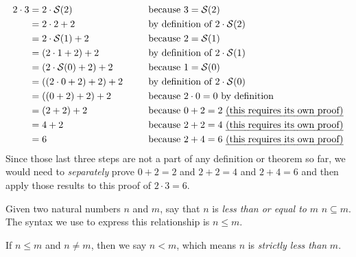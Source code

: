 \begin{example}[$2 \cdot 3 = 6$]
    ~\vspace{-\baselineskip}
    \begin{alignat*}{2}
        2 \cdot 3 &= 2 \cdot \successor{2} &&\text{ because } 3 = \successor{2}\\
              &= 2 \cdot 2 + 2 &&\text{ by definition of } 2 \cdot \successor{2}\\
              &= 2 \cdot \successor{1} + 2 &&\text{ because } 2 = \successor{1}\\
              &= \pn*{2 \cdot 1 + 2} + 2 &&\text{ by definition of } 2 \cdot \successor{1}\\
              &= \pn*{2 \cdot \successor{0} + 2} + 2 &&\text{ because } 1 = \successor{0}\\
              &= \pn*{\pn*{2 \cdot 0 + 2} + 2} + 2~~~~&&\text{ by definition of } 2 \cdot \successor{0}\\
              &= \pn*{\pn*{0 + 2} + 2} + 2 &&\text{ because } 2 \cdot 0 = 0 \text{ by definition}\\
              &= \pn*{2 + 2} + 2 &&\text{ because } 0 + 2 = 2 \text{ \emph{(this requires its own proof)}}\\
              &= 4 + 2 &&\text{ because } 2 + 2 = 4 \text{ \emph{(this requires its own proof)}}\\
              &= 6 &&\text{ because } 2 + 4 = 6 \text{ \emph{(this requires its own proof)}}
    \end{alignat*}
    Since those last three steps are not a part of any definition or theorem so far,
    we would need to \emph{separately} prove $0 + 2 = 2$ and $2 + 2 = 4$ and $2 + 4 = 6$
    and then apply those results to this proof of $2 \cdot 3 = 6$.
\end{example}

\begin{definition}
    Given two natural numbers $n$ and $m$,
    say that $n$ is \emph{less than or equal to} $m$ \iffbydefn $n \subseteq m$.
    The syntax we use to express this relationship is $n \leq m$.

    If $n \leq m$ and $n \neq m$, then we say $n < m$,
    which means $n$ is \emph{strictly less than} $m$.
\end{definition}

